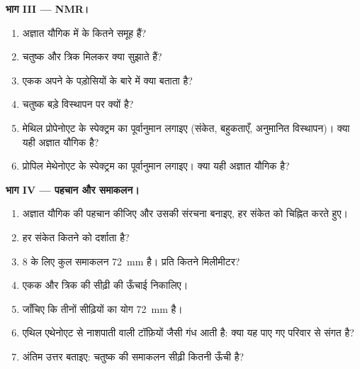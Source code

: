 \begin{problem}
\medskip
\noindent\textbf{भाग III --- NMR।}
\begin{enumerate}[resume]
  \item अज्ञात यौगिक में  के कितने समूह हैं?
  \item चतुष्क और त्रिक मिलकर क्या सुझाते हैं?
  \item एकक अपने  के पड़ोसियों के बारे में क्या बताता है?
  \item चतुष्क बड़े विस्थापन पर क्यों है?
  \item मेथिल प्रोपेनोएट  के स्पेक्ट्रम का पूर्वानुमान लगाइए
        (संकेत, बहुकताएँ, अनुमानित विस्थापन)। क्या यही अज्ञात यौगिक है?
  \item प्रोपिल मेथेनोएट के स्पेक्ट्रम का पूर्वानुमान लगाइए। क्या यही अज्ञात यौगिक है?
\end{enumerate}

\medskip
\noindent\textbf{भाग IV --- पहचान और समाकलन।}
\begin{enumerate}[resume]
  \item अज्ञात यौगिक की पहचान कीजिए और उसकी संरचना बनाइए, हर
        संकेत को चिह्नित करते हुए।
  \item हर संकेत कितने  को दर्शाता है?
  \item 8  के लिए कुल समाकलन \qty{72}{mm} है। प्रति  कितने
        मिलीमीटर?
  \item एकक और त्रिक की सीढ़ी की ऊँचाई निकालिए।
  \item जाँचिए कि तीनों सीढ़ियों का योग \qty{72}{mm} है।
  \item एथिल एथेनोएट से नाशपाती वाली टॉफ़ियों जैसी गंध आती है: क्या यह पाए गए
        परिवार से संगत है?
  \item अंतिम उत्तर बताइए: चतुष्क की समाकलन सीढ़ी
        कितनी ऊँची है?
\end{enumerate}
\end{problem}
